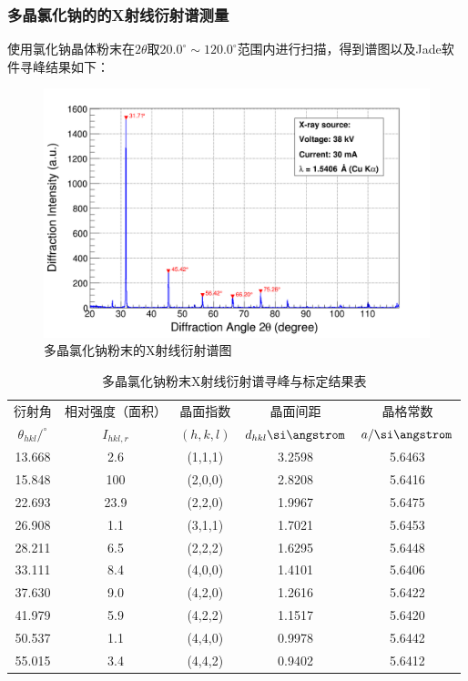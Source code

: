 \documentclass{thuemp}
\begin{document}
\subsubsection{多晶氯化钠的的X射线衍射谱测量}

使用氯化钠晶体粉末在$2\theta$取$20.0^\circ \sim 120.0^\circ$范围内进行扫描，得到谱图以及Jade软件寻峰结果如下：  

\begin{figure}[H]
    \centering
    \includegraphics[width=0.8\linewidth]{../Data/NaCl-multi.png}
    \caption{多晶氯化钠粉末的X射线衍射谱图}
    \label{fig:nacl_xrd_multi}
\end{figure}

\begin{table}[H]
    \centering
    \captionnamefont{\wuhao\bf\heiti}
    \captiontitlefont{\wuhao\bf\heiti}
    \caption{多晶氯化钠粉末X射线衍射谱寻峰与标定结果表}
    \label{tab:nacl_xrd_multi}
    \liuhao
    \begin{tabular}{ccccc}
        \toprule
        衍射角 & 相对强度（面积）& 晶面指数 & 晶面间距 & 晶格常数 \\
        $\theta_{hkl}/^\circ$ & $I_{hkl,r}$ & $(h,k,l)$ & $d_{hkl}\text{\si\angstrom}$ & $a/\text{\si\angstrom}$ \\
        \midrule
        13.668 &  2.6 & (1,1,1) & 3.2598 & 5.6463 \\
        15.848 &  100 & (2,0,0) & 2.8208 & 5.6416 \\
        22.693 & 23.9 & (2,2,0) & 1.9967 & 5.6475 \\
        26.908 &  1.1 & (3,1,1) & 1.7021 & 5.6453 \\
        28.211 &  6.5 & (2,2,2) & 1.6295 & 5.6448 \\
        33.111 &  8.4 & (4,0,0) & 1.4101 & 5.6406 \\
        37.630 &  9.0 & (4,2,0) & 1.2616 & 5.6422 \\
        41.979 &  5.9 & (4,2,2) & 1.1517 & 5.6420 \\
        50.537 &  1.1 & (4,4,0) & 0.9978 & 5.6442 \\
        55.015 &  3.4 & (4,4,2) & 0.9402 & 5.6412 \\
        \bottomrule
    \end{tabular}
\end{table}
\end{document}
